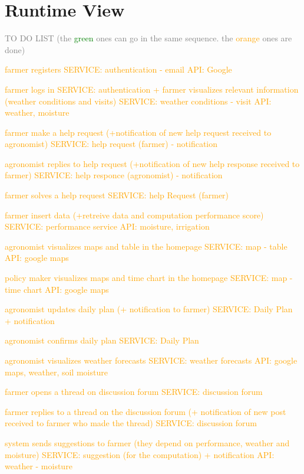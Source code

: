 \section{Runtime View}


\textcolor{gray}{TO DO LIST (the \textcolor{green} {green} ones can go in the same sequence. the \textcolor{orange}{orange} ones are done)
\begin{enumerate}
    \item \textcolor{orange}{farmer registers SERVICE: authentication - email API: Google}
    \item \textcolor{orange}{farmer logs in SERVICE: authentication + farmer visualizes relevant information (weather conditions and visits) SERVICE: weather conditions - visit API: weather, moisture}
    \item \textcolor{orange}{farmer make a help request (+notification of new help request received to agronomist) SERVICE: help request (farmer) - notification}
    \item \textcolor{orange}{agronomist replies to help request (+notification of new help response received to farmer) SERVICE: help responce (agronomist) - notification}
    \item \textcolor{orange}{farmer solves a help request SERVICE: help Request (farmer)}
    \item \textcolor{orange}{farmer insert data (+retreive data and computation performance score) SERVICE: performance service API: moisture, irrigation}
    \item \textcolor{orange}{agronomist visualizes maps and table in the homepage SERVICE: map - table API: google maps}
    \item \textcolor{orange}{policy maker visualizes maps and time chart in the homepage SERVICE: map - time chart API: google maps}
    \textcolor{orange}{
    \item agronomist updates daily plan (+ notification to farmer) SERVICE: Daily Plan + notification}
    \item \textcolor{orange}{agronomist confirms daily plan SERVICE: Daily Plan}
    \item \textcolor{orange}{agronomist visualizes weather forecasts SERVICE: weather forecasts API: google maps, weather, soil moisture }
    \item \textcolor{orange}{farmer opens a thread on discussion forum SERVICE: discussion forum}
    \item \textcolor{orange}{farmer replies to a thread on the discussion forum (+ notification of new post received to farmer who made the thread) SERVICE: discussion forum}
    \item \textcolor{orange}{system sends suggestions to farmer (they depend on performance, weather and moisture) SERVICE: suggestion (for the computation) + notification API: weather - moisture}
\end{enumerate}
}

